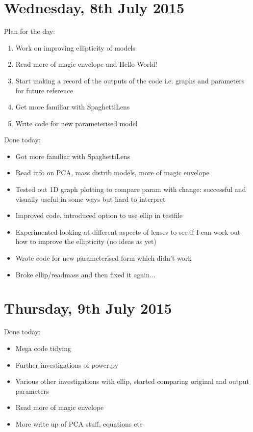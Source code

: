 \documentclass{article}
\begin{document}
\section{Wednesday, 8th July 2015}
\noindent Plan for the day:
\begin{enumerate}
  \item Work on improving ellipticity of models
  \item Read more of magic envelope and Hello World!
  \item Start making a record of the outputs of the code i.e. graphs and parameters for future reference
  \item Get more familiar with SpaghettiLens
  \item Write code for new parameterised model
\end {enumerate}

\noindent Done today:
\begin{itemize}
  \item Got more familiar with SpaghettiLens
  \item Read info on PCA, mass distrib models, more of magic envelope
  \item Tested out 1D graph plotting to compare param with change: successful and visually useful in some ways but hard to interpret
  \item Improved code, introduced option to use ellip in testfile
  \item Experimented looking at different aspects of lenses to see if I can work out how to improve the ellipticity (no ideas as yet)
  \item Wrote code for new parameterised form which didn't work
  \item Broke ellip/readmass and then fixed it again...
\end{itemize}\newpage

\section{Thursday, 9th July 2015}
\noindent Done today:
\begin{itemize}
  \item Mega code tidying
  \item Further investigations of power.py
  \item Various other investigations with ellip, started comparing original and output parameters
  \item Read more of magic envelope
  \item More write up of PCA stuff, equations etc
\end{itemize}
\end{document}
